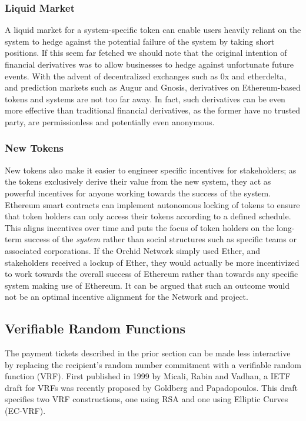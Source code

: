 \subsubsection{Liquid Market}

A liquid market for a system-specific token can enable users heavily reliant on the system to hedge against the potential failure of the system by taking short positions. If this seem far fetched we should note that the original intention of financial derivatives was to allow businesses to hedge against unfortunate future events. With the advent of decentralized exchanges such as 0x\cite{ETH0x} and etherdelta\cite{EtherDelta}, and prediction markets such as Augur\cite{Augur} and Gnosis\cite{Gnosis}, derivatives on Ethereum-based tokens and systems are not too far away. In fact, such derivatives can be even more effective\cite{ETHDerivatives} than traditional financial derivatives, as the former have no trusted party, are permissionless and potentially even anonymous.

\subsubsection{New Tokens}

New tokens also make it easier to engineer specific incentives for stakeholders; as the tokens exclusively derive their value from the new system, they act as powerful incentives for anyone working towards the success of the system. Ethereum smart contracts can implement autonomous locking of tokens to ensure that token holders can only access their tokens according to a defined schedule. This aligns incentives over time and puts the focus of token holders on the long-term success of the \emph{system} rather than social structures such as specific teams or associated corporations. If the Orchid Network simply used Ether, and stakeholders received a lockup of Ether, they would actually be more incentivized to work towards the overall success of Ethereum rather than towards any specific system making use of Ethereum. It can be argued that such an outcome would not be an optimal incentive alignment for the \Orchid{} Network and project.

\subsection{Verifiable Random Functions}
\label{sec:vrfs}

The payment tickets described in the prior section can be made less interactive by replacing the recipient's random number commitment with a verifiable random function (VRF). First published in 1999 by Micali, Rabin and Vadhan\cite{VRF}, a IETF draft for VRFs was recently proposed by Goldberg and Papadopoulos\cite{IETFVRF}. This draft specifies two VRF constructions, one using RSA and one using Elliptic Curves (EC-VRF).

